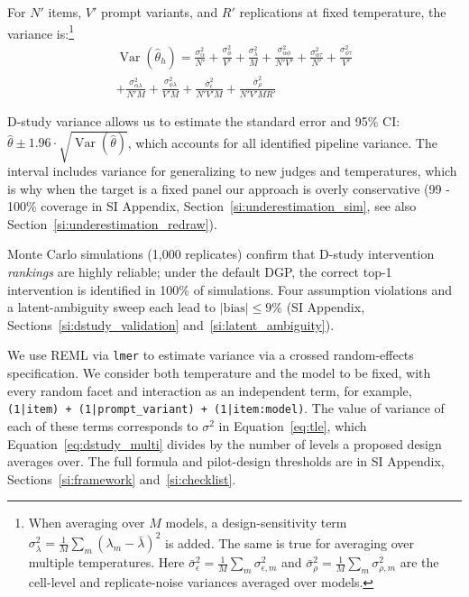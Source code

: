 \documentclass{article}
\DeclareMathOperator{\Var}{Var}
\begin{document}
For $N'$ items, $V'$ prompt variants, and $R'$ replications at fixed temperature, the variance is:\footnote{When averaging over $M$ models, a design-sensitivity term $\sigma^2_\lambda = \frac{1}{M}\sum_m(\lambda_m - \bar{\lambda})^2$ is added. The same is true for averaging over multiple temperatures. Here $\bar{\sigma}^2_\epsilon = \frac{1}{M}\sum_m \sigma^2_{\epsilon,m}$ and $\bar{\sigma}^2_\rho = \frac{1}{M}\sum_m \sigma^2_{\rho,m}$ are the cell-level and replicate-noise variances averaged over models.}
\begin{equation}
\label{eq:dstudy_multi}
\begin{split}
\Var(\hat{\theta}_h) = \frac{\sigma^2_\alpha}{N'} + \frac{\sigma^2_\phi}{V'} + \frac{\sigma^2_\lambda}{M} + \frac{\sigma^2_{\alpha\phi}}{N'V'} + \frac{\sigma^2_{\alpha\tau}}{N'} + \frac{\sigma^2_{\phi\tau}}{V'} \\
+ \frac{\sigma^2_{\alpha\lambda}}{N'M} + \frac{\sigma^2_{\phi\lambda}}{V'M} + \frac{\bar{\sigma}^2_\epsilon}{N'V'M} + \frac{\bar{\sigma}^2_\rho}{N'V'MR'}
\end{split}
\end{equation}

D-study variance allows us to estimate the standard error and 95\% CI: $\hat{\theta} \pm 1.96 \cdot \sqrt{\Var(\hat{\theta})}$, which accounts for all identified pipeline variance. The interval includes variance for generalizing to new judges and temperatures, which is why when the target is a fixed panel our approach is overly conservative (99 - 100\% coverage in SI Appendix, Section~\ref{si:underestimation_sim}, see also Section~\ref{si:underestimation_redraw}). 

Monte Carlo simulations (1,000 replicates) confirm that D-study intervention \emph{rankings} are highly reliable; under the default DGP, the correct top-1 intervention is identified in 100\% of simulations. Four assumption violations and a latent-ambiguity sweep each lead to $|\text{bias}| \leq 9\%$ (SI Appendix, Sections~\ref{si:dstudy_validation} and~\ref{si:latent_ambiguity}).

We use REML \citep{jiang1996reml} via \texttt{lmer} \citep{bates2015lme4} to estimate variance via a crossed random-effects specification. We consider both temperature and the model to be fixed, with every random facet and interaction as an independent term, for example, \texttt{(1|item) + (1|prompt\_variant) + (1|item:model)}. The value of variance of each of these terms corresponds to $\sigma^2$ in Equation~\ref{eq:tle}, which Equation~\ref{eq:dstudy_multi} divides by the number of levels a proposed design averages over. The full formula and pilot-design thresholds are in SI Appendix, Sections~\ref{si:framework} and~\ref{si:checklist}.
\end{document}
